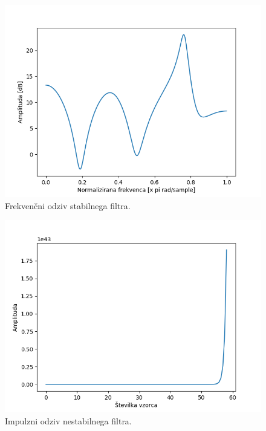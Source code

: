 \documentclass[a4paper,11pt]{article}
\begin{document}
\begin{figure}[htbp]
\begin{center}
\includegraphics[scale=0.7]{images/freq-response_after.png}
\caption{Frekvenčni odziv stabilnega filtra.}
\label{refreq_after}
\end{center}
\end{figure}

\begin{figure}[htbp]
\begin{center}
\includegraphics[scale=0.7]{images/impulse-response_before.png}
\caption{Impulzni odziv nestabilnega filtra.}
\label{reimp_before}
\end{center}
\end{figure}
\end{document}
